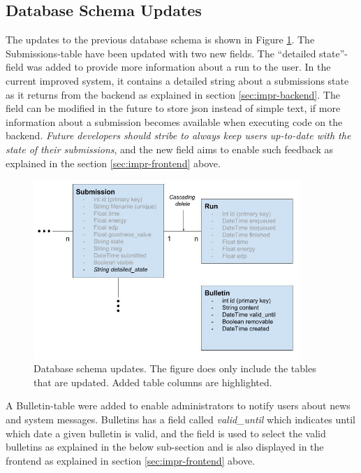 \subsection{Database Schema Updates}
\label{subsec:impr-database}
The updates to the previous database schema is shown in Figure \ref{fig:updated-database-schema}. The Submissions-table have been updated with two new fields. The ``detailed state''-field was added to provide more information about a run to the user. In the current improved system, it contains a detailed string about a submissions state as it returns from the backend as explained in section \ref{sec:impr-backend}. The field can be modified in the future to store \gls{json} instead of simple text, if more information about a submission becomes available when executing code on the backend. \textit{Future developers should stribe to always keep users up-to-date with the state of their submissions}, and the new field aims to enable such feedback as explained in the section \ref{sec:impr-frontend} above. \\

\begin{figure}
    \includegraphics[width=0.9\textwidth]{figs/updated_database_schema.jpg}
    \caption[Database schema updates]{Database schema updates. The figure does only include the tables that are updated. Added table columns are highlighted. }
    \label{fig:updated-database-schema}
\end{figure}

A Bulletin-table were added to enable administrators to notify users about news and system messages. Bulletins has a field called \textit{valid\_until} which indicates until which date a given bulletin is valid, and the field is used to select the valid bulletins as explained in the below sub-section and is also displayed in the frontend as explained in section \ref{sec:impr-frontend} above. \\

